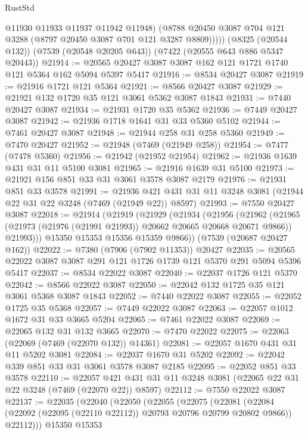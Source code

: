 \begin{lexlean}{RustStd}
\begin{coremodule}
            @11930
            @11933
            @11937
            @11942
            @11948)
          (@8788 @20450 @3087 @704 @121 @3288 (@8797 @20450 @3087 @701 @121 @3287 @8809)))))
    (@8325 (@20544 @132))
    (@7539 (@20548 @20205 @643))
    (@7422 (@20555 @643 @886 @5347 @20443))
@21914 := @20565 @20427 @3087 @3087 @162 @121 @1721 @1740 @121 @5364 @162 @5094 @5397 @5417
@21916 := @8534 @20427 @3087
@21919 := @21916 @1721 @121 @5364
@21921 := @8566 @20427 @3087
@21929 := @21921 @132 @1720 @35 @121 @3061 @5362 @3087 @1843
@21931 := @7440 @20427 @3087
@21934 := @21931 @1720 @35 @5362
@21936 := @7449 @20427 @3087
@21942 := @21936 @1718 @1641 @31 @33 @5360 @5102
@21944 := @7461 @20427 @3087
@21948 := @21944 @258 @31 @258 @5360
@21949 := @7470 @20427
@21952 := @21948 (@7469 (@21949 @258))
@21954 := @7477 (@7478 @5360)
@21956 := @21942 (@21952 @21954)
@21962 := @21936 @1639 @431 @31 @11 @5100 @3081
@21965 := @21916 @1639 @31 @5100
@21973 := @21921 @156 @851 @33 @31 @3061 @3578 @3087 @2179
@21976 := @21931 @851 @33 @3578
@21991 := @21936 @421 @431 @31 @11 @3248 @3081 (@21944 @22 @31 @22 @3248 (@7469 (@21949 @22)) @8597)
@21993 := @7550 @20427 @3087
@22018 := @21914
    (@21919
      (@21929
        (@21934
          (@21956
            (@21962
              (@21965 (@21973 (@21976 (@21991 @21993)) @20662 @20665 @20668 @20671 @9866))
              @21993)))
        @15350
        @15353
        @15356
        @15359
        @9866))
    (@7539 (@20687 @20427 @162))
@22022 := @7380 (@7906 (@7902 @11353)) @20427
@22035 := @20565 @22022 @3087 @3087 @291 @121 @1726 @1739 @121 @5370 @291 @5094 @5396 @5417
@22037 := @8534 @22022 @3087
@22040 := @22037 @1726 @121 @5370
@22042 := @8566 @22022 @3087
@22050 := @22042 @132 @1725 @35 @121 @3061 @5368 @3087 @1843
@22052 := @7440 @22022 @3087
@22055 := @22052 @1725 @35 @5368
@22057 := @7449 @22022 @3087
@22063 := @22057 @1012 @1672 @31 @33 @3665 @5204
@22065 := @7461 @22022 @3087
@22069 := @22065 @132 @31 @132 @3665
@22070 := @7470 @22022
@22075 := @22063 (@22069 (@7469 (@22070 @132)) @14361)
@22081 := @22057 @1670 @431 @31 @11 @5202 @3081
@22084 := @22037 @1670 @31 @5202
@22092 := @22042 @339 @851 @33 @31 @3061 @3578 @3087 @2185
@22095 := @22052 @851 @33 @3578
@22110 := @22057 @421 @431 @31 @11 @3248 @3081 (@22065 @22 @31 @22 @3248 (@7469 (@22070 @22)) @8597)
@22112 := @7550 @22022 @3087
@22137 := @22035
    (@22040
      (@22050
        (@22055
          (@22075
            (@22081
              (@22084 (@22092 (@22095 (@22110 @22112)) @20793 @20796 @20799 @20802 @9866))
              @22112)))
        @15350
        @15353

\end{coremodule}
\end{lexlean}
